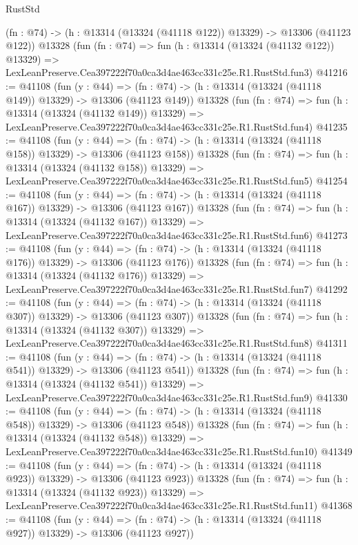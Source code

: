 \begin{lexlean}{RustStd}
\begin{coremodule}
    (fn : @74) -> (h : @13314 (@13324 (@41118 @122)) @13329) -> @13306 (@41123 @122))
    @13328
    (fun (fn : @74) =>
    fun (h : @13314 (@13324 (@41132 @122)) @13329) =>
    LexLeanPreserve.Cea397222f70a0ca3d4ae463cc331c25e.R1.RustStd.fun3)
@41216 := @41108
    (fun (y : @44) =>
    (fn : @74) -> (h : @13314 (@13324 (@41118 @149)) @13329) -> @13306 (@41123 @149))
    @13328
    (fun (fn : @74) =>
    fun (h : @13314 (@13324 (@41132 @149)) @13329) =>
    LexLeanPreserve.Cea397222f70a0ca3d4ae463cc331c25e.R1.RustStd.fun4)
@41235 := @41108
    (fun (y : @44) =>
    (fn : @74) -> (h : @13314 (@13324 (@41118 @158)) @13329) -> @13306 (@41123 @158))
    @13328
    (fun (fn : @74) =>
    fun (h : @13314 (@13324 (@41132 @158)) @13329) =>
    LexLeanPreserve.Cea397222f70a0ca3d4ae463cc331c25e.R1.RustStd.fun5)
@41254 := @41108
    (fun (y : @44) =>
    (fn : @74) -> (h : @13314 (@13324 (@41118 @167)) @13329) -> @13306 (@41123 @167))
    @13328
    (fun (fn : @74) =>
    fun (h : @13314 (@13324 (@41132 @167)) @13329) =>
    LexLeanPreserve.Cea397222f70a0ca3d4ae463cc331c25e.R1.RustStd.fun6)
@41273 := @41108
    (fun (y : @44) =>
    (fn : @74) -> (h : @13314 (@13324 (@41118 @176)) @13329) -> @13306 (@41123 @176))
    @13328
    (fun (fn : @74) =>
    fun (h : @13314 (@13324 (@41132 @176)) @13329) =>
    LexLeanPreserve.Cea397222f70a0ca3d4ae463cc331c25e.R1.RustStd.fun7)
@41292 := @41108
    (fun (y : @44) =>
    (fn : @74) -> (h : @13314 (@13324 (@41118 @307)) @13329) -> @13306 (@41123 @307))
    @13328
    (fun (fn : @74) =>
    fun (h : @13314 (@13324 (@41132 @307)) @13329) =>
    LexLeanPreserve.Cea397222f70a0ca3d4ae463cc331c25e.R1.RustStd.fun8)
@41311 := @41108
    (fun (y : @44) =>
    (fn : @74) -> (h : @13314 (@13324 (@41118 @541)) @13329) -> @13306 (@41123 @541))
    @13328
    (fun (fn : @74) =>
    fun (h : @13314 (@13324 (@41132 @541)) @13329) =>
    LexLeanPreserve.Cea397222f70a0ca3d4ae463cc331c25e.R1.RustStd.fun9)
@41330 := @41108
    (fun (y : @44) =>
    (fn : @74) -> (h : @13314 (@13324 (@41118 @548)) @13329) -> @13306 (@41123 @548))
    @13328
    (fun (fn : @74) =>
    fun (h : @13314 (@13324 (@41132 @548)) @13329) =>
    LexLeanPreserve.Cea397222f70a0ca3d4ae463cc331c25e.R1.RustStd.fun10)
@41349 := @41108
    (fun (y : @44) =>
    (fn : @74) -> (h : @13314 (@13324 (@41118 @923)) @13329) -> @13306 (@41123 @923))
    @13328
    (fun (fn : @74) =>
    fun (h : @13314 (@13324 (@41132 @923)) @13329) =>
    LexLeanPreserve.Cea397222f70a0ca3d4ae463cc331c25e.R1.RustStd.fun11)
@41368 := @41108
    (fun (y : @44) =>
    (fn : @74) -> (h : @13314 (@13324 (@41118 @927)) @13329) -> @13306 (@41123 @927))

\end{coremodule}
\end{lexlean}
